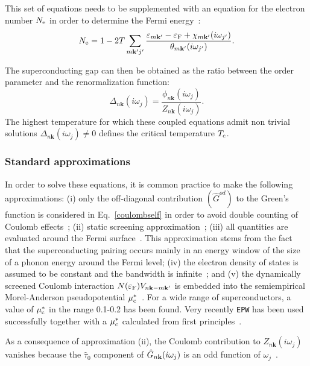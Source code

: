 \documentclass[final,3p,times,twocolumn]{elsarticle}
\begin{document}
This set of equations needs to be supplemented with an equation for the electron number $N_{\rm e}$ in order to determine the Fermi energy~\cite{Marsiglio2008}:
\begin{equation}
N_{\rm e} = 1 - 2T \sum_{m\mathbf{k'}j'}  \frac{\varepsilon_{m\mathbf{k'}}-\varepsilon_{\rm F}+\chi_{m\mathbf{k'}}(i\omega_{j'})}{\theta_{m\mathbf{k'}}(i\omega_{j'})}.
\end{equation}

The superconducting gap can then be obtained as the ratio between the order parameter and the renormalization function:
\begin{equation}
\Delta_{n\mathbf{k}}(i\omega_{j}) = \frac{\phi_{n\mathbf{k}}(i\omega_j)}{Z_{n\mathbf{k}}(i\omega_j)}.
\end{equation}
The highest temperature for which these coupled equations admit non trivial solutions $\Delta_{n\mathbf{k}}(i\omega_{j}) \neq 0$ defines the critical temperature $T_{\rm c}$.

\subsubsection{Standard approximations}

In order to solve these equations, it is common practice to make the following approximations:  
(i) only the off-diagonal contribution $(\hat{G}^{od})$ to the Green's function is considered in Eq.~\eqref{coulombself} in order to avoid double counting of Coulomb effects~\cite{Allen1983a};
(ii) static screening approximation~\cite{Scalapino1966};
(iii) all quantities are evaluated around the Fermi surface~\cite{Scalapino1966,Scalapino1969,Allen1976a,Allen1983a,Choi2003,Marsiglio2008,Margine2013}. This approximation stems from the fact that the superconducting pairing occurs mainly in an energy window of the size of a phonon energy around the Fermi level; 
(iv) the electron density of states is assumed to be constant and the bandwidth is infinite~\cite{Marsiglio2008}; and
(v) the dynamically screened Coulomb interaction $N(\varepsilon_{\rm F}) V_{n\mathbf{k}-m\mathbf{k'}}$ is embedded into the semiempirical Morel-Anderson pseudopotential $\mu_{\rm c}^*$~\cite{Morel1962}. For a wide range of superconductors, a value of $\mu_{\rm c}^*$ in the range 0.1-0.2 has been found. 
Very recently \texttt{EPW} has been used successfully together with a $\mu_{\rm c}^*$ calculated from first principles~\cite{Margine2016}. 

As a consequence of approximation (ii), the Coulomb contribution to $Z_{n\mathbf{k}}(i\omega_j)$ vanishes because the $\hat{\tau}_0$ component of $\hat{G}_{n\bf{k}}(i\omega_j)$ is an odd function of $\omega_j$~\cite{Scalapino1966}.
\end{document}
